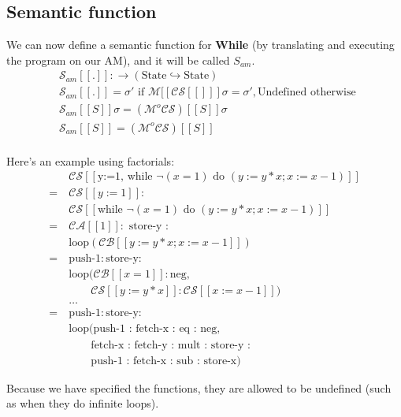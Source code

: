 \documentclass[11pt,a4paper,titlepage,dvipsnames,cmyk]{scrartcl}
\newcommand\pfun{\hookrightarrow}
\begin{document}
\subsection{Semantic function}%
\label{sub:Semantic-function}
We can now define a semantic function for \textbf{While} (by translating
and executing the program on our AM), and it will be called $S_{am}$.
\begin{align*}
    &\mathcal{S}_{am} [\![.]\!]: \rightarrow (\text{State}\pfun\text{State}) \\
    &\mathcal{S}_{am} [\![.]\!] = \sigma' \text{ if }
    \mathcal{M}[\![\mathcal{CS}[\![]\!]\!] \sigma = \sigma', \text{
    Undefined otherwise } \\
    &\mathcal{S}_{am} [\![S]\!] \sigma = (\mathcal{M} ^o
    \mathcal{CS})[\![S]\!] \sigma \\
    &\mathcal{S}_{am} [\![S]\!] = (\mathcal{M} ^o
    \mathcal{CS})[\![S]\!] \\
\end{align*}

Here's an example using factorials:
\begin{align*}
    &\mathcal{CS} [\![\text{y:=1, while } \neg (x=1) \text{ do } (y:=y * x;
    x:=x-1)]\!] \\
    = \ &\mathcal{CS}[\![y:=1]\!]: \\
      &\mathcal{ CS}[\![\text{while } \neg (x=1) \text{ do }
      (y:=y*x;x:=x-1)]\!] \\
    = \ &\mathcal{CA}[\![1]\!]: \text{ store-y }: \\
      &\text{loop}(\mathcal{CB}[\![y:=y * x; x:= x-1]\!]) \\
    = \ &\text{push-1}: \text{store-y}: \\
      &\text{loop}(\mathcal{CB}[\![x=1]\!]: \text{neg}, \\
      &\quad \quad \mathcal{CS}[\![y:=y * x]\!] : \mathcal{CS}[\![x:=x-1]\!])\\
    &\dots \\
    = \ &\text{push-1}:\text{store-y}: \\
    &\text{loop}(\text{push-1 : fetch-x : eq : neg,} \\
    &\quad \quad \text{fetch-x : fetch-y : mult : store-y :} \\
    &\quad  \quad\text{push-1 : fetch-x : sub : store-x})
\end{align*}

Because we have specified the functions, they are allowed to be undefined
(such as when they do infinite loops). 
\end{document}
